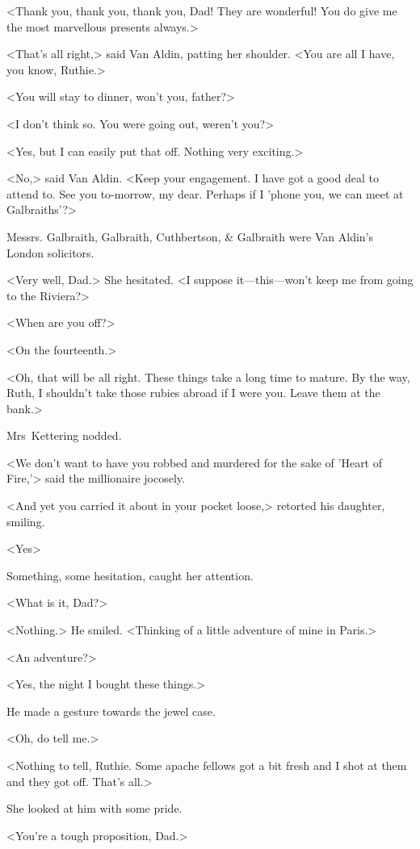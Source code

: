 <Thank you, thank you, thank you, Dad! They are wonderful! You do give me the most marvellous presents always.>

<That's all right,> said Van Aldin, patting her shoulder. <You are all I have, you know, Ruthie.>

<You will stay to dinner, won't you, father?>

<I don't think so. You were going out, weren't you?>

<Yes, but I can easily put that off. Nothing very exciting.>

<No,> said Van Aldin. <Keep your engagement. I have got a good deal to attend to. See you to-morrow, my dear. Perhaps if I 'phone you, we can meet at Galbraiths'?>

Messrs. Galbraith, Galbraith, Cuthbertson, \& Galbraith were Van Aldin's London solicitors.

<Very well, Dad.> She hesitated. <I suppose it—this—won't keep me from going to the Riviera?>

<When are you off?>

<On the fourteenth.>

<Oh, that will be all right. These things take a long time to mature. By the way, Ruth, I shouldn't take those rubies abroad if I were you. Leave them at the bank.>

Mrs~Kettering nodded.

<We don't want to have you robbed and murdered for the sake of 'Heart of Fire,'> said the millionaire jocosely.

<And yet you carried it about in your pocket loose,> retorted his daughter, smiling.

<Yes\longdash>

Something, some hesitation, caught her attention.

<What is it, Dad?>

<Nothing.> He smiled. <Thinking of a little adventure of mine in Paris.>

<An adventure?>

<Yes, the night I bought these things.>

He made a gesture towards the jewel case.

<Oh, do tell me.>

<Nothing to tell, Ruthie. Some apache fellows got a bit fresh and I shot at them and they got off. That's all.>

She looked at him with some pride.

<You're a tough proposition, Dad.>

